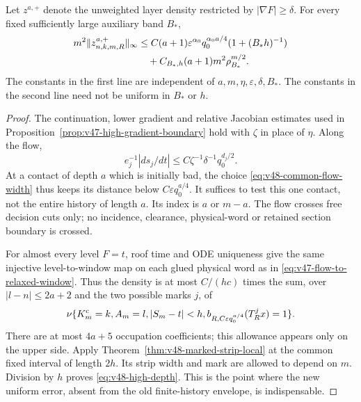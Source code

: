 \begin{proposition}
\label{prop:v48-high-depth}
Let $z^{a,+}$ denote the unweighted layer density restricted by
$|\nabla F|\ge\delta$. For every fixed sufficiently large auxiliary
band $B_*$,
\begin{align}
 m^2\|z^{a,+}_{n,k,m,R}\|_\infty
 &\le C(a+1)\varepsilon^{\alpha_0}q_0^{\alpha_0a/4}
                      (1+(B_*h)^{-1})\notag\\
 &\quad+C_{B_*,h}(a+1)m^2\rho_{B_*}^{m/2}.
                                      \label{eq:v48-high-depth}
\end{align}
The constants in the first line are independent of $a,m,\eta,
\varepsilon,\delta,B_*$. The constants in the second line need not
be uniform in $B_*$ or $h$.
\end{proposition}
\begin{proof}
The continuation, lower gradient and relative Jacobian estimates used
in Proposition~\ref{prop:v47-high-gradient-boundary} hold with
$\zeta$ in place of $\eta$. Along the flow,
\[
 e_j^{-1}|ds_j/dt|
       \le C\zeta^{-1}\delta^{-1}q_0^{d_j/2}.
\]
At a contact of depth $a$ which is initially bad, the choice
\eqref{eq:v48-common-flow-width} thus keeps its distance below
$C\varepsilon q_0^{a/4}$. It suffices to test this one contact, not
the entire history of length $a$. Its index is $a$ or $m-a$.
The flow crosses free decision cuts only; no incidence, clearance,
physical-word or retained section boundary is crossed.

For almost every level $F=t$, roof time and ODE uniqueness give the
same injective level-to-window map on each glued physical word as in
\eqref{eq:v47-flow-to-relaxed-window}. Thus the density is at most
$C/(hc)$ times the sum, over $|l-n|\le2a+2$ and the two possible
marks $j$, of
\[
 \nu\{K_m^{\rm c}=k,A_m=l,|S_m-t|<h,
                b_{R,C\varepsilon q_0^{a/4}}(T_R^jx)=1\}.
\]
There are at most $4a+5$ occupation coefficients; this allowance
appears only on the upper side. Apply
Theorem~\ref{thm:v48-marked-strip-local} at the common fixed interval
of length $2h$. Its strip width and mark are allowed to depend on
$m$. Division by $h$ proves \eqref{eq:v48-high-depth}.
This is the point where the new uniform error, absent from the old
finite-history envelope, is indispensable.
\end{proof}

